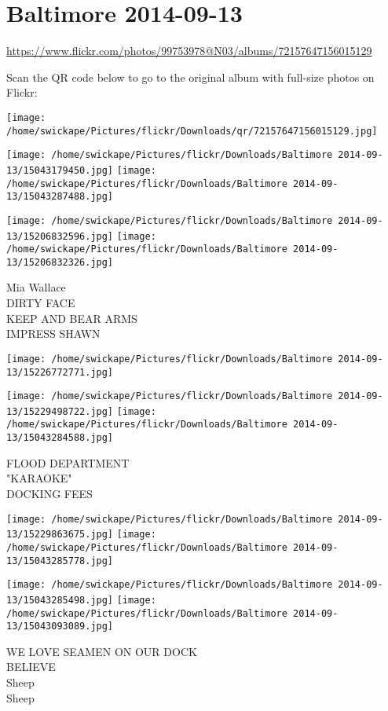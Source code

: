\documentclass[10pt,letterpaper]{article}
\title{}
\author{}
\date{}
\begin{document}
\section*{Baltimore 2014-09-13}

\url{https://www.flickr.com/photos/99753978@N03/albums/72157647156015129}

Scan the QR code below to go to the original album with full-size photos on Flickr:

\texttt{[image: /home/swickape/Pictures/flickr/Downloads/qr/72157647156015129.jpg]}
\pagebreak

\texttt{[image: /home/swickape/Pictures/flickr/Downloads/Baltimore 2014-09-13/15043179450.jpg]}
\texttt{[image: /home/swickape/Pictures/flickr/Downloads/Baltimore 2014-09-13/15043287488.jpg]}

\texttt{[image: /home/swickape/Pictures/flickr/Downloads/Baltimore 2014-09-13/15206832596.jpg]}
\texttt{[image: /home/swickape/Pictures/flickr/Downloads/Baltimore 2014-09-13/15206832326.jpg]}

Mia Wallace\\
DIRTY FACE\\
KEEP AND BEAR ARMS\\
IMPRESS SHAWN
\pagebreak

\texttt{[image: /home/swickape/Pictures/flickr/Downloads/Baltimore 2014-09-13/15226772771.jpg]}

\vspace{0.25in}
\texttt{[image: /home/swickape/Pictures/flickr/Downloads/Baltimore 2014-09-13/15229498722.jpg]}
\texttt{[image: /home/swickape/Pictures/flickr/Downloads/Baltimore 2014-09-13/15043284588.jpg]}

FLOOD DEPARTMENT\\
"KARAOKE"\\
DOCKING FEES
\pagebreak

\texttt{[image: /home/swickape/Pictures/flickr/Downloads/Baltimore 2014-09-13/15229863675.jpg]}
\texttt{[image: /home/swickape/Pictures/flickr/Downloads/Baltimore 2014-09-13/15043285778.jpg]}

\texttt{[image: /home/swickape/Pictures/flickr/Downloads/Baltimore 2014-09-13/15043285498.jpg]}
\texttt{[image: /home/swickape/Pictures/flickr/Downloads/Baltimore 2014-09-13/15043093089.jpg]}

WE LOVE SEAMEN ON OUR DOCK\\
BELIEVE\\
Sheep\\
Sheep
\pagebreak
\end{document}
